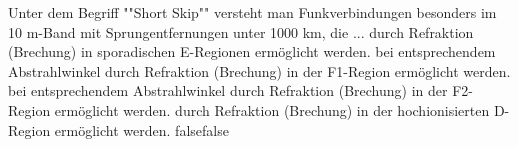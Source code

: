     {Unter dem Begriff ""Short Skip"" versteht man Funkverbindungen besonders im 10 m-Band mit Sprungentfernungen unter 1000 km, die ...}
    {durch Refraktion (Brechung) in sporadischen E-Regionen ermöglicht werden.}
    {bei entsprechendem Abstrahlwinkel durch Refraktion (Brechung) in der F1-Region ermöglicht werden.}
    {bei entsprechendem Abstrahlwinkel durch Refraktion (Brechung) in der F2-Region ermöglicht werden.}
    {durch Refraktion (Brechung) in der hochionisierten D-Region ermöglicht werden.}
    {false}{false}